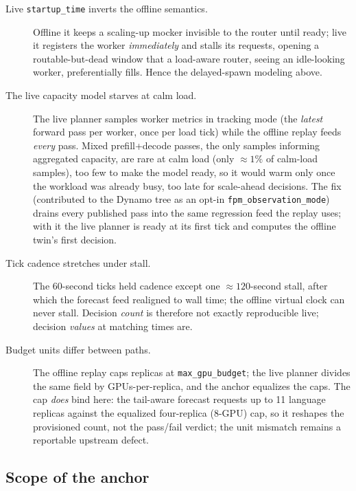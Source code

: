 \begin{description}
\item[Live \texttt{startup\_time} inverts the offline semantics.] Offline it
keeps a scal\-ing-up mocker invisible to the router until ready; live it
registers the worker \emph{immediately} and stalls its requests, opening a
routable-but-dead window that a load-aware router, seeing an idle-looking
worker, preferentially fills. Hence the delayed-spawn modeling above.
\item[The live capacity model starves at calm load.] The live planner
samples worker metrics in tracking mode (the \emph{latest} forward pass per worker,
once per load tick) while the offline replay feeds \emph{every} pass. Mixed
prefill+decode passes, the only samples informing aggregated capacity, are
rare at calm load (only ${\approx}1\%$ of calm-load samples), too few
to make the model ready, so it would warm only once the workload was already
busy, too late for scale-ahead decisions. The fix (contributed to the Dynamo
tree as an opt-in \texttt{fpm\_observation\_mode}) drains every published
pass into the same regression feed the replay uses; with it the live planner
is ready at its first tick and computes the offline twin's first decision.
\item[Tick cadence stretches under stall.] The 60-second ticks held cadence
except one ${\approx}120$-second stall, after which the forecast feed
realigned to wall time; the offline virtual clock can never stall. Decision
\emph{count} is therefore not exactly reproducible live; decision
\emph{values} at matching times are.
\item[Budget units differ between paths.] The offline replay caps replicas
at \texttt{max\_\allowbreak gpu\_\allowbreak budget}; the live planner divides the same field by
GPUs-per-replica, and the anchor equalizes the caps. The cap \emph{does}
bind here: the tail-aware forecast requests up to 11 language replicas
against the equalized four-replica (8-GPU) cap, so it reshapes the
provisioned count, not the pass/fail verdict; the unit mismatch remains a
reportable upstream defect.
\end{description}

\subsection{Scope of the anchor}
\label{sec:val-scope}

